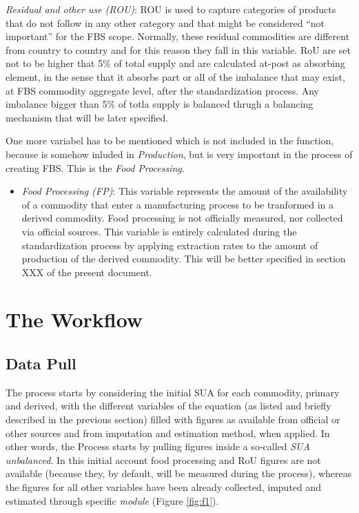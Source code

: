 \documentclass[]{article}
\providecommand{\tightlist}{%
  \setlength{\itemsep}{0pt}\setlength{\parskip}{0pt}}
\begin{document}
\begin{itemize}
  \emph{Residual and other use (ROU)}: ROU is used to capture categories
  of products that do not follow in any other category and that might be
  considered ``not important'' for the FBS scope. Normally, these
  residual commodities are different from country to country and for
  this reason they fall in this variable. RoU are set not to be higher
  that 5\% of total supply and are calculated at-post as absorbing
  element, in the sense that it absorbs part or all of the imbalance
  that may exist, at FBS commodity aggregate level, after the
  standardization process. Any imbalance bigger than 5\% of totla supply
  is balanced thrugh a balancing mechanism that will be later specified.
\end{itemize}

One more variabel has to be mentioned which is not included in the
function, because is somehow inluded in \emph{Production}, but is very
important in the process of creating FBS. This is the \emph{Food
Processing}.

\begin{itemize}
\tightlist
\item
  \emph{Food Processing (FP)}: This variable represents the amount of
  the availability of a commodity that enter a manufacturing process to
  be tranformed in a derived commodity. Food processing is not
  officially measured, nor collected via official sources. This variable
  is entirely calculated during the standardization process by applying
  extraction rates to the amount of production of the derived commodity.
  This will be better specified in section XXX of the present document.
\end{itemize}

\section{The Workflow}\label{the-workflow}

\subsection{Data Pull}\label{data-pull}

The process starts by considering the initial SUA for each commodity,
primary and derived, with the different variables of the equation (as
listed and briefly described in the previous section) filled with
figures as available from official or other sources and from imputation
and estimation method, when applied. In other words, the Process starts
by pulling figures inside a so-called \emph{SUA unbalanced}. In this
initial account food processing and RoU figures are not available
(because they, by default, will be measured during the process), whereas
the figures for all other variables have been already collected, imputed
and estimated through specific \emph{module} (Figure \ref{fig:f1}).
\end{document}

